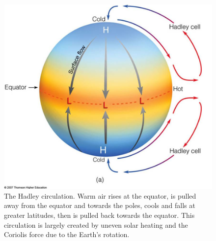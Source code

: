 \begin{figure}[h]
  \centering \includegraphics[width=0.9\linewidth]{figures/hadleycell.png}
  \caption{The Hadley circulation. Warm air rises at the equator, is pulled away
    from the equator and towards the poles, cools and falls at greater
    latitudes, then is pulled back towards the equator. This circulation is
    largely created by uneven solar heating and the Coriolis force due to the
    Earth's rotation.}
  \label{fig:hadleycell}
\end{figure}





